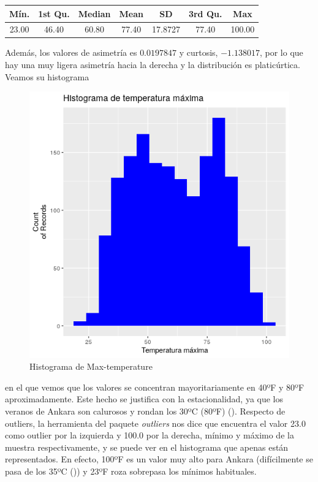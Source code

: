 \begin{table}[H]
	\centering
	\begin{tabular}{|c|c|c|c|c|c|c|}
		\hline
		Mín.  & 1st Qu. & Median & Mean  & SD      & 3rd Qu. & Max    \\ \hline
		23.00 & 46.40   & 60.80  & 77.40 & 17.8727 & 77.40   & 100.00 \\ \hline
	\end{tabular}
\end{table}


Además, los valores de asimetría es $0.0197847$ y curtosis, $-1.138017$, por lo que hay una muy ligera asimetría hacia la derecha y la distribución es platicúrtica. Veamos su histograma

\begin{figure}[H] %
	\centering
	\includegraphics[scale=0.7]{hist-max-temp.png}  %
	\caption{Histograma de Max-temperature} 
	\label{fig:hist-max-temp}
\end{figure}

en el que vemos que los valores se concentran mayoritariamente en 40ºF y 80ºF aproximadamente. Este hecho se justifica con la estacionalidad, ya que los veranos de Ankara son calurosos y rondan los 30ºC (80ºF) (\cite{ankara-weather}). Respecto de outliers, la herramienta del paquete \textit{outliers} nos dice que encuentra el valor 23.0 como outlier por la izquierda y 100.0 por la derecha, mínimo y máximo de la muestra respectivamente, y se puede ver en el histograma que apenas están representados. En efecto, 100ºF es un valor muy alto para Ankara (difícilmente se pasa de los 35ºC (\cite{ankara-weather})) y 23ºF roza sobrepasa los mínimos habituales. \\

